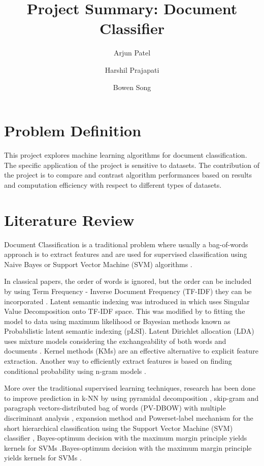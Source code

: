 \documentclass[10pt,twocolumn,letterpaper]{article}
\begin{document}
\title{Project Summary: Document Classifier}
\author[1]{Arjun Patel}
\author[1]{Harshil Prajapati}
\author[1]{Bowen Song}

\maketitle

\section{Problem Definition}
   This project explores machine learning algorithms for document classification. The specific application of the project is sensitive to datasets. The contribution of the project is to compare and contrast algorithm performances based on results and computation efficiency with respect to different types of datasets.


\section{Literature Review}
Document Classification is a traditional problem where usually a bag-of-words approach is to extract features and are used for supervised classification using Naive Bayes or Support Vector Machine (SVM) algorithms \cite{sachan2018investigating}. 

\hspace{15pt} In classical papers, the order of words is ignored, but the order can be included by using Term Frequency - Inverse Document Frequency (TF-IDF) they can be incorporated \cite{maes1995agents}. Latent semantic indexing was introduced in \cite{deerwester1990indexing} which uses Singular Value Decomposition onto TF-IDF space. This was modified by \cite{hofmann1999probabilistic} to fitting the model to data using maximum likelihood or Bayesian methods known as Probabilistic latent semantic indexing (pLSI). Latent Dirichlet allocation (LDA) uses mixture models considering the exchangeability of both words and documents \cite{blei2003latent}. Kernel methods (KMs) are an effective alternative to explicit feature extraction. Another way to efficiently extract features is based on finding conditional probability using n-gram models \cite{furnkranz1998study} .

\hspace{15pt} More over the traditional supervised learning techniques, research has been done to improve prediction in k-NN by using pyramidal decomposition \cite{heroux1998classification},  skip-gram and paragraph vectors-distributed bag of words (PV-DBOW) with multiple discriminant analysis \cite{lauren2018discriminant}, expansion method and Powerset-label mechanism for the short hierarchical classification using the Support Vector Machine (SVM) classifier \cite{salih2018term}, Bayes-optimum decision with the maximum margin principle yields kernels for SVMs \cite{ding2014sensing}.Bayes-optimum decision with the maximum margin principle yields kernels for SVMs \cite{ding2014sensing}.
\end{document}
